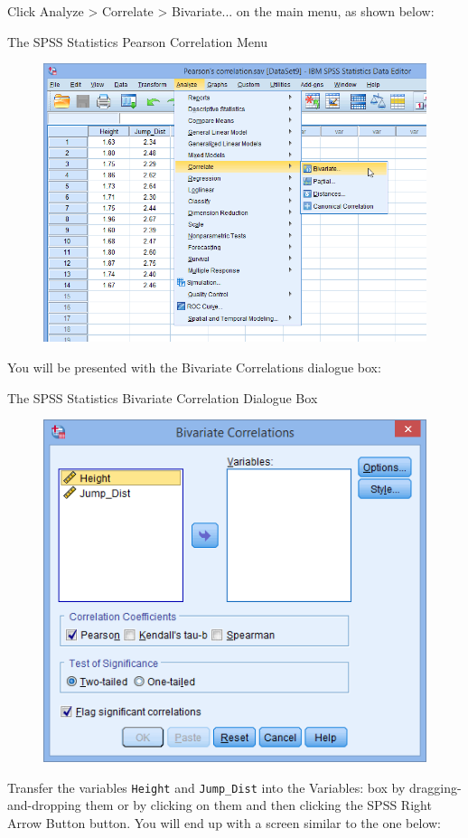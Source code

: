 \documentclass[]{article}
\begin{document}
Click Analyze > Correlate > Bivariate... on the main menu, as shown below:

The SPSS Statistics Pearson Correlation Menu
\begin{figure}
\centering
\includegraphics[width=0.7\linewidth]{images/pearsons-correlation-menu}
\caption{}
\label{fig:pearsons-correlation-menu}
\end{figure}

You will be presented with the Bivariate Correlations dialogue box:

The SPSS Statistics Bivariate Correlation Dialogue Box
\begin{figure}
\centering
\includegraphics[width=0.7\linewidth]{images/pearsons-correlation-dialogue-box}
\caption{}
\label{fig:pearsons-correlation-dialogue-box}
\end{figure}

Transfer the variables \texttt{Height} and \texttt{Jump\_Dist} into the Variables: box by dragging-and-dropping them or by clicking on them and then clicking the SPSS Right Arrow Button button. You will end up with a screen similar to the one below:
\end{document}
